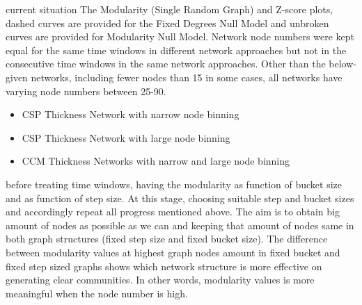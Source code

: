 {%
	
	
	
	current situation
	The Modularity (Single Random Graph) and Z-score plots, dashed curves are provided for the Fixed Degrees Null Model and unbroken curves are provided for Modularity Null Model.
	Network node numbers were kept equal for the same time windows in different network approaches but not in the consecutive time windows in the same network approaches.
	Other than the below-given networks, including fewer nodes than 15 in some cases, all networks have varying node numbers between 25-90.
	\begin{itemize}
		\item CSP Thickness Network with narrow node binning
		\item CSP Thickness Network with large node binning
		\item CCM Thickness Networks with narrow and large node binning
	\end{itemize}

before treating time windows, having the modularity as function of bucket size and as function of step size. At this stage, choosing suitable step and bucket sizes and accordingly repeat all progress mentioned above. The aim is to obtain big amount of nodes as possible as we can and keeping that amount of nodes same in both graph structures (fixed step size and fixed bucket size). The difference between modularity values at highest graph nodes amount in fixed bucket and fixed step sized graphs shows which network structure is more effective on generating clear communities. In other words, modularity values is more meaningful when the node number is high.

}
